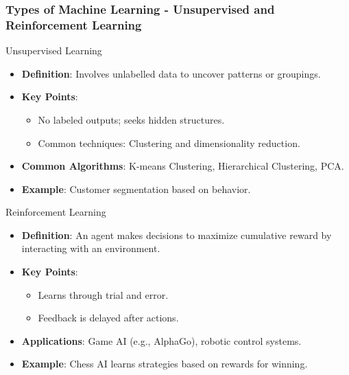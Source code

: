 \documentclass[aspectratio=169]{beamer}
\begin{document}
\begin{frame}[fragile]
    \frametitle{Types of Machine Learning - Unsupervised and Reinforcement Learning}
    \begin{block}{Unsupervised Learning}
        \begin{itemize}
            \item \textbf{Definition}: Involves unlabelled data to uncover patterns or groupings.
            \item \textbf{Key Points}:
                \begin{itemize}
                    \item No labeled outputs; seeks hidden structures.
                    \item Common techniques: Clustering and dimensionality reduction.
                \end{itemize}
            \item \textbf{Common Algorithms}: K-means Clustering, Hierarchical Clustering, PCA.
            \item \textbf{Example}: Customer segmentation based on behavior.
        \end{itemize}
    \end{block}
    
    \begin{block}{Reinforcement Learning}
        \begin{itemize}
            \item \textbf{Definition}: An agent makes decisions to maximize cumulative reward by interacting with an environment.
            \item \textbf{Key Points}:
                \begin{itemize}
                    \item Learns through trial and error.
                    \item Feedback is delayed after actions.
                \end{itemize}
            \item \textbf{Applications}: Game AI (e.g., AlphaGo), robotic control systems.
            \item \textbf{Example}: Chess AI learns strategies based on rewards for winning.
        \end{itemize}
    \end{block}
\end{frame}
\end{document}
